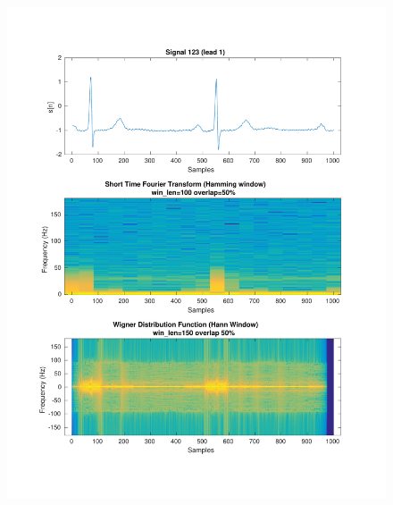 \documentclass[11pt,a4paper]{article}
\begin{document}
\begin{figure}[H]
\centering
\begin{minipage}{0.48\textwidth}
	\centering
	\includegraphics[width=\textwidth]{fig/123l1_stft_wdf.pdf}
\end{minipage}
\begin{minipage}{0.48\textwidth}
	\centering

\end{minipage}
\end{figure}
\end{document}
